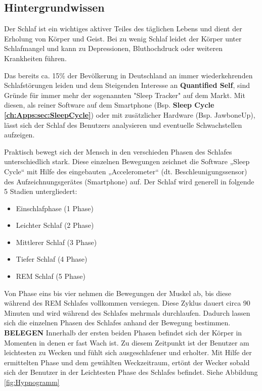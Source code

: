\subsection{Hintergrundwissen}
\label{ch:Apps:sec:Sleepcycle:subsec:H}

Der Schlaf ist ein wichtiges aktiver Teiles des täglichen Lebens und dient der Erholung von Körper und Geist.
Bei zu wenig Schlaf leidet der Körper unter Schlafmangel und kann zu Depressionen, Bluthochdruck oder weiteren Krankheiten führen. \cite{Chen:SleepMonitoring}

Das bereits ca. 15\% der Bevölkerung in Deutschland an immer wiederkehrenden Schlafstörungen leiden und dem Steigenden Interesse an \textbf{Quantified Self}, sind Gründe für immer mehr der sogenannten "Sleep Tracker" auf dem Markt. 
Mit diesen, als reiner Software auf dem Smartphone (Bsp. \textbf{Sleep Cycle \ref{ch:Apps:sec:SleepCycle}}) oder mit zusätzlicher Hardware (Bsp. JawboneUp), lässt sich der Schlaf des Benutzers analysieren und eventuelle Schwachstellen aufzeigen.

Praktisch bewegt sich der Mensch in den verschieden Phasen des Schlafes unterschiedlich stark.
Diese einzelnen Bewegungen zeichnet die Software „Sleep Cycle“ mit Hilfe des eingebauten „Accelerometer“ (dt. Beschleunigungssensor) des Aufzeichnungsgerätes (Smartphone) auf.
Der Schlaf wird generell in folgende 5 Stadien untergliedert:

\begin{itemize}
	\item Einschlafphase (1 Phase)
	\item Leichter Schlaf (2 Phase)
	\item Mittlerer Schlaf (3 Phase)
	\item Tiefer Schlaf (4 Phase)
	\item REM Schlaf (5 Phase)
\end{itemize}

Von Phase eins bis vier nehmen die Bewegungen der Muskel ab, bis diese während des REM Schlafes vollkommen versiegen.
Diese Zyklus dauert circa 90 Minuten und wird während des Schlafes mehrmals durchlaufen.
Dadurch lassen sich die einzelnen Phasen des Schlafes anhand der Bewegung bestimmen. \textbf{BELEGEN}
Innerhalb der ersten beiden Phasen befindet sich der Körper in Momenten in denen er fast Wach ist. Zu diesem Zeitpunkt ist der Benutzer am leichtesten zu Wecken und fühlt sich ausgeschlafener und erholter.
Mit Hilfe der ermittelten Phase und dem gewählten Weckzeitraum, ertönt der Wecker sobald sich der Benutzer in der Leichtesten Phase des Schlafes befindet. Siehe Abbildung \ref{fig:Hypnogramm}


